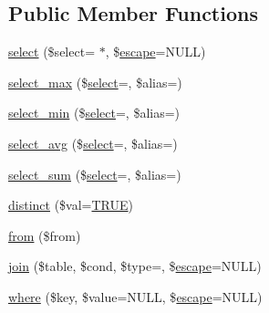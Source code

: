 \subsection*{Public Member Functions}
\begin{DoxyCompactItemize}
\item 
\mbox{\hyperlink{class_c_i___d_b__query__builder_a406a7ea81e717e56496f61baf3e03f44}{select}} (\$select=\textquotesingle{} $\ast$\textquotesingle{}, \$\mbox{\hyperlink{class_c_i___d_b__driver_ac8f37ca5703d4558c732e692194f8cd6}{escape}}=N\+U\+LL)
\item 
\mbox{\hyperlink{class_c_i___d_b__query__builder_a4eac30ba8703ba8f62664e3b4ea1a177}{select\+\_\+max}} (\$\mbox{\hyperlink{class_c_i___d_b__query__builder_a406a7ea81e717e56496f61baf3e03f44}{select}}=\textquotesingle{}\textquotesingle{}, \$alias=\textquotesingle{}\textquotesingle{})
\item 
\mbox{\hyperlink{class_c_i___d_b__query__builder_ab8cf650dd779435da91d6f50bf082528}{select\+\_\+min}} (\$\mbox{\hyperlink{class_c_i___d_b__query__builder_a406a7ea81e717e56496f61baf3e03f44}{select}}=\textquotesingle{}\textquotesingle{}, \$alias=\textquotesingle{}\textquotesingle{})
\item 
\mbox{\hyperlink{class_c_i___d_b__query__builder_a0377f6833e394c977823e21413772761}{select\+\_\+avg}} (\$\mbox{\hyperlink{class_c_i___d_b__query__builder_a406a7ea81e717e56496f61baf3e03f44}{select}}=\textquotesingle{}\textquotesingle{}, \$alias=\textquotesingle{}\textquotesingle{})
\item 
\mbox{\hyperlink{class_c_i___d_b__query__builder_a42348c349cf2fa7ca0210087efcf98d3}{select\+\_\+sum}} (\$\mbox{\hyperlink{class_c_i___d_b__query__builder_a406a7ea81e717e56496f61baf3e03f44}{select}}=\textquotesingle{}\textquotesingle{}, \$alias=\textquotesingle{}\textquotesingle{})
\item 
\mbox{\hyperlink{class_c_i___d_b__query__builder_a65b172f03eea17b7fa243f5732a592bd}{distinct}} (\$val=\mbox{\hyperlink{constants_8php_ae04a3efe6aa42044f803ee90c2277846}{T\+R\+UE}})
\item 
\mbox{\hyperlink{class_c_i___d_b__query__builder_a91f5f004ed8e2237a4decc5d23ac3457}{from}} (\$from)
\item 
\mbox{\hyperlink{class_c_i___d_b__query__builder_a54557b1ef757507cbbd2a8802a99810b}{join}} (\$table, \$cond, \$type=\textquotesingle{}\textquotesingle{}, \$\mbox{\hyperlink{class_c_i___d_b__driver_ac8f37ca5703d4558c732e692194f8cd6}{escape}}=N\+U\+LL)
\item 
\mbox{\hyperlink{class_c_i___d_b__query__builder_a2356c4b7b93fb83c62a354a8a0748222}{where}} (\$key, \$value=N\+U\+LL, \$\mbox{\hyperlink{class_c_i___d_b__driver_ac8f37ca5703d4558c732e692194f8cd6}{escape}}=N\+U\+LL)

\end{DoxyCompactItemize}
